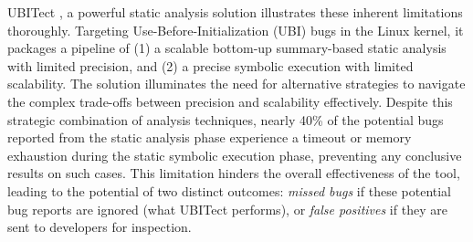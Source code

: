 UBITect \cite{ubitect}, a powerful static analysis solution illustrates these inherent limitations thoroughly. Targeting Use-Before-Initialization (UBI) bugs in the Linux kernel, it packages a pipeline of (1) a scalable bottom-up summary-based static analysis with limited precision, and (2) a precise symbolic execution with limited scalability.
The solution illuminates the need for alternative strategies to navigate the complex trade-offs between precision and scalability effectively.
Despite this strategic combination of analysis techniques, nearly 40\% of the potential bugs reported from the static analysis phase experience a timeout or memory exhaustion during the static symbolic execution phase, preventing any conclusive results on such cases. 
This limitation hinders the overall effectiveness of the tool, leading to the potential of two distinct outcomes: \textit{missed bugs} if these potential bug reports are ignored (what UBITect performs), or \textit{false positives} if they are sent to developers for inspection.








